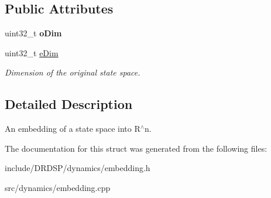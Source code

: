 \subsection*{Public Attributes}
\begin{DoxyCompactItemize}
\item 
\hypertarget{struct_d_r_d_s_p_1_1_embedding_ac49e8aa042fbf2ee8e9fdc3d2b4f1c26}{uint32\-\_\-t {\bfseries o\-Dim}}\label{struct_d_r_d_s_p_1_1_embedding_ac49e8aa042fbf2ee8e9fdc3d2b4f1c26}

\item 
\hypertarget{struct_d_r_d_s_p_1_1_embedding_aa49b8deb5d403025ca5db3f483c015b2}{uint32\-\_\-t \hyperlink{struct_d_r_d_s_p_1_1_embedding_aa49b8deb5d403025ca5db3f483c015b2}{e\-Dim}}\label{struct_d_r_d_s_p_1_1_embedding_aa49b8deb5d403025ca5db3f483c015b2}

\begin{DoxyCompactList}\small\item\em Dimension of the original state space. \end{DoxyCompactList}\end{DoxyCompactItemize}


\subsection{Detailed Description}
An embedding of a state space into R$^\wedge$n. 

The documentation for this struct was generated from the following files\-:\begin{DoxyCompactItemize}
\item 
include/\-D\-R\-D\-S\-P/dynamics/embedding.\-h\item 
src/dynamics/embedding.\-cpp\end{DoxyCompactItemize}

